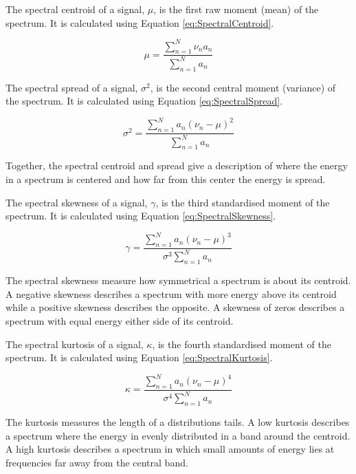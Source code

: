 		The spectral centroid of a signal, $\mu$, is the first raw moment (mean) of the spectrum. It is calculated
		using Equation \ref{eq:SpectralCentroid}.

		\begin{equation}
			\mu = \frac{\sum_{n = 1}^{N} \nu_{n}a_{n}}
				   {\sum_{n = 1}^{N} a_{n}}
			\label{eq:SpectralCentroid}
		\end{equation}

		The spectral spread of a signal, $\sigma^{2}$, is the second central moment (variance) of the
		spectrum. It is calculated using Equation \ref{eq:SpectralSpread}.

		\begin{equation}
			\sigma^{2} = \frac{\sum_{n = 1}^{N} a_{n}(\nu_{n} - \mu)^{2}}
					  {\sum_{n = 1}^{N} a_{n}}
			\label{eq:SpectralSpread}
		\end{equation}

		Together, the spectral centroid and spread give a description of where the energy in a spectrum is centered
		and how far from this center the energy is spread.

		The spectral skewness of a signal, $\gamma$, is the third standardised moment of the spectrum. It is
		calculated using Equation \ref{eq:SpectralSkewness}.

		\begin{equation}
			\gamma = \frac{\sum_{n = 1}^{N} a_{n}(\nu_{n} - \mu)^{3}}
				      {\sigma^{3}\sum_{n = 1}^{N} a_{n}}
			\label{eq:SpectralSkewness}
		\end{equation}

		The spectral skewness measure how symmetrical a spectrum is about its centroid. A negative skewness
		describes a spectrum with more energy above its centroid while a positive skewness describes the opposite.
		A skewness of zeros describes a spectrum with equal energy either side of its centroid.

		The spectral kurtosis of a signal, $\kappa$, is the fourth standardised moment of the spectrum. It
		is calculated using Equation \ref{eq:SpectralKurtosis}.

		\begin{equation}
			\kappa = \frac{\sum_{n = 1}^{N} a_{n}(\nu_{n} - \mu)^{4}}
				      {\sigma^{4}\sum_{n = 1}^{N} a_{n}}
			\label{eq:SpectralKurtosis}
		\end{equation}

		The kurtosis measures the length of a distributions tails. A low kurtosis describes a spectrum where the
		energy in evenly distributed in a band around the centroid. A high kurtosis describes a spectrum in which
		small amounts of energy lies at frequencies far away from the central band.

